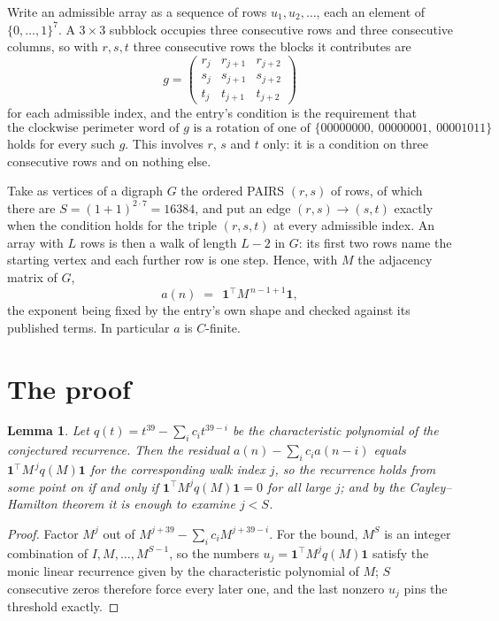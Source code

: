 \documentclass[11pt,a4paper]{article}
\theoremstyle{plain}
\newtheorem{lemma}[theorem]{Lemma}
\theoremstyle{definition}
\begin{document}
Write an admissible array as a sequence of rows $u_1,u_2,\dots$, each an element of
$\{0,\dots,1\}^{7}$. A $3\times3$ subblock occupies three consecutive rows and
three consecutive columns, so with $r,s,t$ three consecutive rows the blocks it
contributes are
\[
g=\begin{pmatrix}r_j&r_{j+1}&r_{j+2}\\ s_j&s_{j+1}&s_{j+2}\\ t_j&t_{j+1}&t_{j+2}\end{pmatrix}
\]
for each admissible index, and the entry's condition is the requirement that
\[
\text{the clockwise perimeter word of }g\text{ is a rotation of one of }\{00000000,\ 00000001,\ 00001011\}
\]
holds for every such $g$. This involves $r$, $s$ and $t$ only: it is a condition on
three consecutive rows and on nothing else.

Take as vertices of a digraph $G$ the ordered PAIRS $(r,s)$ of rows, of which there are
$S=(1+1)^{2\cdot7}=16384$, and put an edge $(r,s)\to(s,t)$ exactly when the condition
holds for the triple $(r,s,t)$ at every admissible index. An array with $L$ rows is then a
walk of length $L-2$ in $G$: its first two rows name the starting vertex and each further
row is one step. Hence, with $M$ the adjacency matrix of $G$,
\[
a(n)\;=\;\,\mathbf{1}^{\!\top}M^{\,n-1+1}\mathbf{1},
\]
the exponent being fixed by the entry's own shape and checked against its published terms.
In particular $a$ is $C$-finite.

\section{The proof}

\begin{lemma}\label{lem:crit}
Let $q(t)=t^{39}-\sum_i c_it^{39-i}$ be the characteristic polynomial of the
conjectured recurrence. Then the residual $a(n)-\sum_ic_ia(n-i)$ equals
$\mathbf{1}^{\!\top}M^{\,j}q(M)\mathbf{1}$ for the corresponding walk index
$j$, so the recurrence holds from some point on if and only if
$\mathbf{1}^{\!\top}M^{j}q(M)\mathbf{1}=0$ for all large $j$; and by the
Cayley--Hamilton theorem it is enough to examine $j<S$.
\end{lemma}

\begin{proof}
Factor $M^{j}$ out of $M^{j+39}-\sum_ic_iM^{j+39-i}$. For the bound, $M^{S}$
is an integer combination of $I,M,\dots,M^{S-1}$, so the numbers
$u_j=\mathbf{1}^{\!\top}M^{j}q(M)\mathbf{1}$ satisfy the monic linear recurrence given by
the characteristic polynomial of $M$; $S$ consecutive zeros therefore force every later one,
and the last nonzero $u_j$ pins the threshold exactly.
\end{proof}
\end{document}
